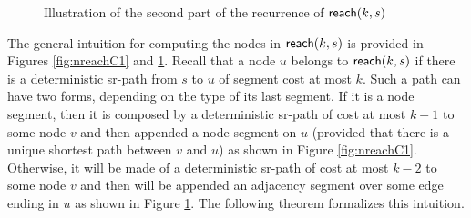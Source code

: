 \begin{figure}
\begin{center}
\end{center}
\caption{Illustration of the second part of the recurrence of $\textsf{reach}(k, s)$}
\label{fig:nreachC2}
\end{figure}

The general intuition for computing the nodes in $\textsf{reach}(k, s)$ is provided in 
Figures \ref{fig:nreachC1} and \ref{fig:nreachC2}. Recall that a node $u$ belongs to
$\textsf{reach}(k, s)$ if there is a deterministic sr-path from $s$ to $u$ of segment cost at most $k$.
Such a path can have two forms, depending on the type of its last segment. If it is a node segment,
then it is composed by a deterministic sr-path of cost at most $k - 1$ to some node $v$ and then
appended a node segment on $u$ (provided that there is a unique shortest path between $v$ and $u$) as
shown in Figure \ref{fig:nreachC1}. 
Otherwise, it will be made of a deterministic sr-path of cost at most $k - 2$ to some node $v$
and then will be appended an adjacency segment over some edge ending in $u$ as shown in Figure
\ref{fig:nreachC2}. The following theorem formalizes this intuition.

